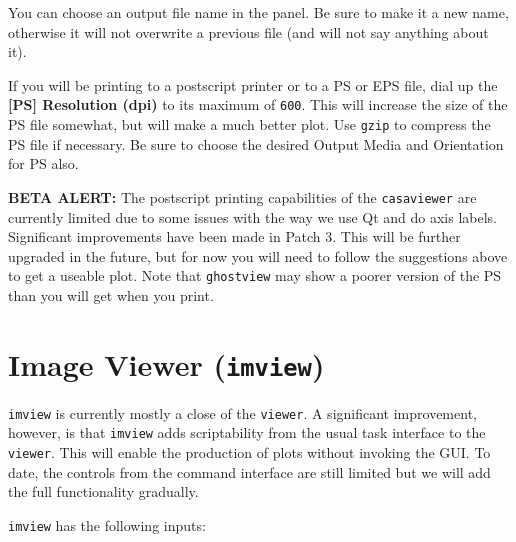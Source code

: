 You can choose an output file name in the panel.  Be sure to
make it a new name, otherwise it will not overwrite a previous file
(and will not say anything about it).

If you will be printing to a postscript printer or to a PS or EPS file,
dial up the {\bf [PS] Resolution (dpi)} to its maximum of {\tt 600}.  
This will increase the size of the PS file somewhat, but will
make a much better plot.  Use {\tt gzip} to compress the PS file
if necessary.
Be sure to choose the desired Output Media and Orientation for
PS also.

{\bf BETA ALERT:} The postscript printing capabilities of the 
{\tt casaviewer} are currently limited due to some issues with the
way we use Qt and do axis labels.  Significant improvements have
been made in Patch 3.  This will be further upgraded in the
future, but for now you will need to follow the suggestions above
to get a useable plot.  Note that {\tt ghostview} may show a poorer
version of the PS than you will get when you print.

\section{Image Viewer ({\tt imview})}
\label{section:display.imview}

{\tt imview} is currently mostly a close of the {\tt viewer}. A
significant improvement, however, is that {\tt imview} adds
scriptability from the usual task interface to the {\tt viewer}. This
will enable the production of plots without invoking the GUI. To date,
the controls from the command interface are still limited but we will
add the full functionality gradually. 

{\tt imview} has the following inputs:

